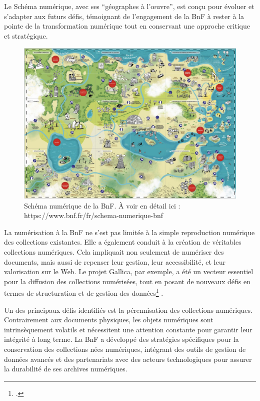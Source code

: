 \documentclass[a4paper,12pt,twoside]{book}
\begin{document}
	Le Schéma numérique, avec ses “géographes à l’œuvre”, est conçu pour évoluer et s’adapter aux futurs défis, témoignant de l’engagement de la BnF à rester à la pointe de la transformation numérique tout en conservant une approche critique et stratégique.
	\\
	
	\begin{figure}[h!]
		\centering
		\includegraphics[width=\textwidth]{images/schema-bnf-num.png}
		\caption{Schéma numérique de la BnF. À voir en détail ici : 
			https://www.bnf.fr/fr/schema-numerique-bnf}
		\label{fig:monimage}
	\end{figure}
	

	La numérisation à la BnF ne s’est pas limitée à la simple reproduction numérique des collections existantes. Elle a également conduit à la création de véritables collections numériques. Cela impliquait non seulement de numériser des documents, mais aussi de repenser leur gestion, leur accessibilité, et leur valorisation sur le Web. Le projet Gallica, par exemple, a été un vecteur essentiel pour la diffusion des collections numérisées, tout en posant de nouveaux défis en termes de structuration et de gestion des données\footcite{bermes_numerique_2020} .
	
	Un des principaux défis identifiés est la pérennisation des collections numériques. Contrairement aux documents physiques, les objets numériques sont intrinsèquement volatils et nécessitent une attention constante pour garantir leur intégrité à long terme. La BnF a développé des stratégies spécifiques pour la conservation des collections nées numériques, intégrant des outils de gestion de données avancés et des partenariats avec des acteurs technologiques pour assurer la durabilité de ses archives numériques.
	
\end{document}

